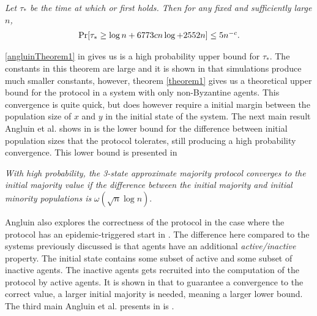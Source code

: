  \begin{theorem}
    \textit{Let $\tau_*$ be the time at which  or  first holds. Then for any fixed  and sufficiently large $n$,}
    \begin{align}
        \centerline{$\Pr[\tau_* \geq \log n + 6773cn \log + 2552n] \leq 5n^{-c}$.}  \label{angluinTheorem1} 
    \end{align}
 \end{theorem}

\ref{angluinTheorem1} in  gives us is a high probability upper bound for $\tau_*$. The constants in this theorem are large and it is shown in \cite{angluinSimplePopulationProtocol2008} that simulations produce much smaller constants, however, theorem \ref{theorem1} gives us a theoretical upper bound for the protocol in a system with only non-Byzantine agents. This convergence is quite quick, but does however require a initial margin between the population size of $x$ and $y$ in the initial state of the system. The next main result Angluin et al. shows in \cite{angluinSimplePopulationProtocol2008} is the lower bound for the difference between initial population sizes that the protocol tolerates, still producing a high probability convergence. This lower bound is presented in 


 \begin{theorem}
    \textit{With high probability, the 3-state approximate majority protocol converges to the initial majority value if the difference between the initial majority and initial minority populations is } $\omega(\sqrt{n} \log n)$.
 \end{theorem} 

 Angluin also explores the correctness of the protocol in the case where the protocol has an epidemic-triggered start in \cite{angluinSimplePopulationProtocol2008}. The difference here compared to the systems previously discussed is that agents have an additional \emph{active/inactive} property. The initial state contains some subset of active and some subset of inactive agents. The inactive agents gets recruited into the computation of the protocol by active agents. It is shown in \cite{angluinSimplePopulationProtocol2008} that to guarantee a convergence to the correct value, a larger initial majority is needed, meaning a larger lower bound. The third main Angluin et al. presents in \cite{angluinSimplePopulationProtocol2008} is .

